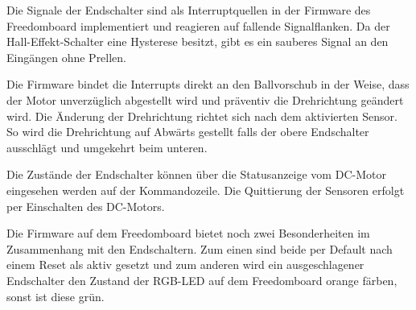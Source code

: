 Die Signale der Endschalter sind als Interruptquellen in der Firmware des
Freedomboard implementiert und reagieren auf fallende Signalflanken. Da
der Hall-Effekt-Schalter eine Hysterese besitzt, gibt es ein sauberes
Signal an den Eingängen ohne Prellen.

Die Firmware bindet die Interrupts direkt an den Ballvorschub in der Weise,
dass der Motor unverzüglich abgestellt wird und präventiv die Drehrichtung
geändert wird. Die Änderung der Drehrichtung richtet sich nach dem
aktivierten Sensor. So wird die Drehrichtung auf Abwärts gestellt
falls der obere Endschalter ausschlägt und umgekehrt beim unteren.

Die Zustände der Endschalter können über die Statusanzeige vom DC-Motor
eingesehen werden auf der Kommandozeile. Die Quittierung der Sensoren
erfolgt per Einschalten des DC-Motors.

Die Firmware auf dem Freedomboard bietet noch zwei Besonderheiten im
Zusammenhang mit den Endschaltern. Zum einen sind beide per Default nach
einem Reset als aktiv gesetzt und zum anderen wird ein ausgeschlagener
Endschalter den Zustand der RGB-LED auf dem Freedomboard orange färben,
sonst ist diese grün.
